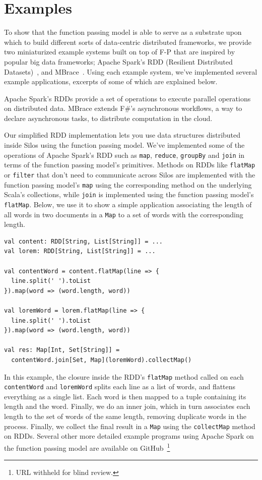\documentclass{jfp1}
\begin{document}
\section{Examples}
\label{sec:examples}

To show that the function passing model is able to serve as a substrate upon
which to build different sorts of data-centric distributed frameworks, we
provide two miniaturized example systems built on top of F-P that are inspired
by popular big data frameworks; Apache Spark's RDD (Resilient Distributed
Datasets)~\cite{Spark}, and MBrace~\cite{MBrace}. Using each example system,
we've implemented several example applications, excerpts of some of which are
explained below.

Apache Spark's RDDs provide a set of operations to execute parallel operations
on distributed data. MBrace extends F\#’s asynchronous workflows, a way to
declare asynchronous tasks, to distribute computation in the cloud.

Our simplified RDD implementation lets you use data structures distributed
inside Silos using the function passing model. We've implemented some of the
operations of Apache Spark’s RDD such as \verb|map|, \verb|reduce|,
\verb|groupBy| and \verb|join| in terms of the function passing model's
primitives. Methods on RDDs like \verb|flatMap| or \verb|filter| that don’t need
to communicate across Silos are implemented with the function passing model’s
\verb|map| using the corresponding method on the underlying Scala’s collections,
while \verb|join| is implemented using the function passing model’s
\verb|flatMap|. Below, we use it to show a simple application associating the
length of all words in two documents in a \verb|Map| to a set of words with the
corresponding length.

\begin{lstlisting}
val content: RDD[String, List[String]] = ...
val lorem: RDD[String, List[String]] = ...

val contentWord = content.flatMap(line => {
  line.split(' ').toList
}).map(word => (word.length, word))

val loremWord = lorem.flatMap(line => {
  line.split(' ').toList
}).map(word => (word.length, word))

val res: Map[Int, Set[String]] =
  contentWord.join[Set, Map](loremWord).collectMap()
\end{lstlisting}

In this example, the closure inside the RDD's \verb|flatMap| method called on
each \verb|contentWord| and \verb|loremWord| splits each line as a list of
words, and flattens everything as a single list. Each word is then mapped to a
tuple containing its length and the word. Finally, we do an inner join, which in
turn associates each length to the set of words of the same length, removing
duplicate words in the process. Finally, we collect the final result in a
\verb|Map| using the \verb|collectMap| method on RDDs. Several other more
detailed example programs using Apache Spark on the function passing model are
available on GitHub~\footnote{URL withheld for blind review.}
\end{document}
